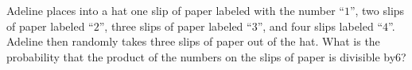 Adeline places into a hat one slip of paper labeled with the number ``$1$'', two slips of paper labeled ``$2$'', three slips of paper labeled ``$3$'', and four slips labeled ``$4$''. Adeline then randomly takes three slips of paper out of the hat. What is the probability that the product of the numbers on the slips of paper is divisible by$ 6$?

